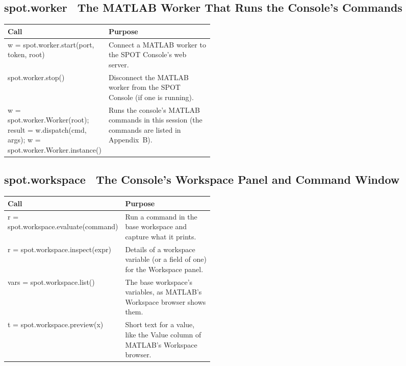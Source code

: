 \documentclass[11pt,a4paper]{article}
\begin{document}
\subsection*{spot.worker \textmd{\textendash\ The MATLAB Worker That Runs the Console's Commands}}
\begin{xltabular}{\linewidth}{@{}>{\raggedright\arraybackslash\ttfamily\footnotesize}p{0.47\linewidth} >{\raggedright\arraybackslash\small}X@{}}
\toprule \normalfont\small\textbf{Call} & \textbf{Purpose} \\ \midrule \endhead
w = spot.worker.start(port, token, root) & Connect a MATLAB worker to the SPOT Console's web server. \\
spot.worker.stop() & Disconnect the MATLAB worker from the SPOT Console (if one is running). \\
w = spot.worker.Worker(root); result = w.dispatch(cmd, args); w = spot.worker.Worker.instance() & Runs the console's MATLAB commands in this session (the commands are listed in Appendix~B). \\
\bottomrule\end{xltabular}
\subsection*{spot.workspace \textmd{\textendash\ The Console's Workspace Panel and Command Window}}
\begin{xltabular}{\linewidth}{@{}>{\raggedright\arraybackslash\ttfamily\footnotesize}p{0.47\linewidth} >{\raggedright\arraybackslash\small}X@{}}
\toprule \normalfont\small\textbf{Call} & \textbf{Purpose} \\ \midrule \endhead
r = spot.workspace.evaluate(command) & Run a command in the base workspace and capture what it prints. \\
r = spot.workspace.inspect(expr) & Details of a workspace variable (or a field of one) for the Workspace panel. \\
vars = spot.workspace.list() & The base workspace's variables, as MATLAB's Workspace browser shows them. \\
t = spot.workspace.preview(x) & Short text for a value, like the Value column of MATLAB's Workspace browser. \\
\bottomrule\end{xltabular}
\end{document}
